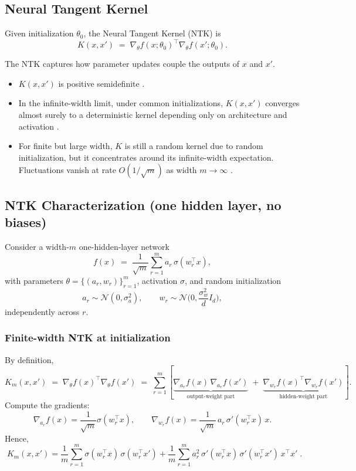 \subsection{Neural Tangent Kernel}

\begin{definition}
	Given initialization $\theta_0$, the Neural Tangent Kernel (NTK) is
	\[
		K(x,x') \;=\; \nabla_\theta f(x;\theta_0)^\top \nabla_\theta f(x';\theta_0).
	\]
\end{definition}

\noindent
The NTK captures how parameter updates couple the outputs of $x$ and $x'$.

\begin{remark}\label{rem:ntk}
	\leavevmode
	\begin{itemize}
		\item $K(x,x')$ is positive semidefinite \citep{jacot2018ntk}.
		\item In the infinite-width limit, under common initializations, $K(x,x')$ converges almost surely to a deterministic kernel depending only on architecture and activation \citep{jacot2018ntk, lee2019wide}.
		\item For finite but large width, $K$ is still a random kernel due to random initialization,
		      but it concentrates around its infinite-width expectation.
		      Fluctuations vanish at rate $O(1/\sqrt{m})$ as width $m \to \infty$
		      \citep{jacot2018ntk, lee2019wide}.
	\end{itemize}
\end{remark}

\subsection{NTK Characterization (one hidden layer, no biases)}\label{subsec:ntk-onelayer}

Consider a width-$m$ one-hidden-layer network
\[
	f(x)\;=\;\frac{1}{\sqrt{m}}\sum_{r=1}^m a_r\,\sigma(w_r^\top x),
\]
with parameters $\theta=\{(a_r,w_r)\}_{r=1}^m$, activation $\sigma$, and random initialization
\[
	a_r \sim \mathcal N(0,\sigma_a^2),\qquad
	w_r \sim \mathcal N\!\Big(0,\frac{\sigma_w^2}{d}I_d\Big),
\]
independently across $r$.

\subsubsection*{Finite-width NTK at initialization}
By definition,
\[
	K_m(x,x') \;=\; \nabla_\theta f(x)^\top \nabla_\theta f(x')
	\;=\;\sum_{r=1}^m\!\left[
		\underbrace{\nabla_{a_r} f(x)\,\nabla_{a_r} f(x')}_{\text{output-weight part}}
		\;+\;
		\underbrace{\nabla_{w_r} f(x)^\top \nabla_{w_r} f(x')}_{\text{hidden-weight part}}
		\right].
\]
Compute the gradients:
\[
	\nabla_{a_r} f(x)=\frac{1}{\sqrt{m}}\sigma(w_r^\top x),
	\qquad
	\nabla_{w_r} f(x)=\frac{1}{\sqrt{m}}\,a_r\,\sigma'(w_r^\top x)\,x.
\]
Hence,
\[
	\boxed{\;
		K_m(x,x')
		=\frac{1}{m}\sum_{r=1}^m \sigma(w_r^\top x)\,\sigma(w_r^\top x')
		+\frac{1}{m}\sum_{r=1}^m a_r^2\,\sigma'(w_r^\top x)\,\sigma'(w_r^\top x')\,x^\top x'\; }.
\]

